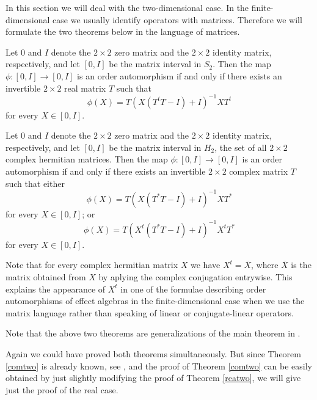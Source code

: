 \documentclass{article}
\begin{document}
In this section we will deal with the two-dimensional case. In the finite-dimen\-sio\-nal case we usually identify operators with matrices. Therefore we will formulate the two theorems below in the language of matrices. 

\begin{theorem}\label{reatwo} 
Let $0$ and $I$ denote the $2 \times 2$ zero matrix and the $2 \times 2$ identity matrix, respectively, and let $[0,I]$ be the matrix interval in $S_2$. Then the map $\phi : [0, I] \to [0, I]$ is an order automorphism if and only if
there exists an invertible $2\times 2$ real matrix $T$
such that
$$
\phi (X) =  T \left( X (T^t T -I) +I \right)^{-1} X T^t
$$
for every
$X \in [0,I]$.
\end{theorem}

\begin{theorem}\label{comtwo} 
Let $0$ and $I$ denote the $2 \times 2$ zero matrix and the $2 \times 2$ identity matrix, respectively, and let $[0,I]$ be the matrix interval in $H_2$,  the set of all $2\times 2$ complex hermitian matrices. Then the map $\phi : [0, I] \to [0, I]$ is an order automorphism if and only if
there exists an invertible $2\times 2$ complex matrix $T$
such that either
$$
\phi (X) =   T \left( X (T^\ast T -I) +I \right)^{-1} X T^\ast
$$
for every
$X \in [0,I]$; or
$$
\phi (X) =  T \left( X^{t}  (T^\ast T -I) +I \right)^{-1} X^{t} T^\ast
$$
for every
$X \in [0,I]$.
\end{theorem}

Note that for every complex hermitian matrix $X$ we have $X^{t} = \overline{X}$, where $\overline{X}$ is the matrix obtained from $X$ by aplying the complex conjugation entrywise. This explains the appearance of $X^{t}$ in one of the formulae describing order automorphisms of effect algebras in the finite-dimensional case when we use the matrix language rather than speaking of linear or conjugate-linear operators.

Note that the above two theorems are generalizations of the main theorem in \cite{MoP}.

Again we could have proved both theorems simultaneously. But since Theorem \ref{comtwo} is already known, see \cite{MS}, and the proof of Theorem \ref{comtwo} can be easily obtained by just slightly modifying the proof of Theorem \ref{reatwo}, we will give just the proof of the real case.
\end{document}
